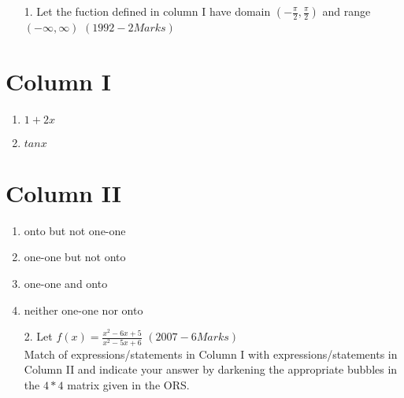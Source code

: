 \documentclass[journal,12pt,twocolumn]{IEEEtran}
\theoremstyle{remark}
\begin{document}
	\begin{enumerate}
		\item[1.] Let the fuction defined in column I have domain $(-\frac{\pi}{2},\frac{\pi}{2})$ and range $(-\infty,\infty)$ \hfill${(1992-2 Marks)}$
	\end{enumerate}
			\begin{multicols}{2} 
				\section*{Column I}
				\begin{enumerate}[label=(\Alph*)]
					\item $1+2x$
					\item $tanx$
				\end{enumerate}
				\columnbreak
				 \section*{Column II}
				\begin{enumerate}[label=(\alph*),start=16]
					\item onto but not one-one
					\item one-one but not onto
					\item one-one and onto
					\item neither one-one nor onto
				\end{enumerate}
			\end{multicols}
			\begin{enumerate}


				\item[2.] Let ${f(x)=\frac{x^2-6x+5}{x^2-5x+6}}$ \hfill${(2007-6 Marks)}$ \\
				 Match of expressions/statements in Column I with expressions/statements in Column II and indicate your answer by darkening the appropriate bubbles in the $4*4$ matrix given in the ORS.
			\end{enumerate}
\end{document}
